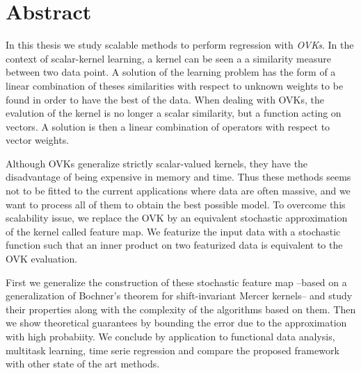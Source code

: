 


\begingroup
\let\clearpage\relax
\let\cleardoublepage\relax
\let\cleardoublepage\relax

\chapter*{Abstract}
In this thesis we study scalable methods to perform regression with \emph{\acl{OVK}s}. In the context of scalar-kernel learning, a kernel can be seen a a similarity measure between two data point. A solution of the learning problem has the form of a linear combination of theses similarities with respect to unknown weights to be found in order to have the best  of the data. When dealing with \acl{OVK}s, the evalution of the kernel is no longer a scalar similarity, but a function acting on vectors. A solution is then a linear combination of operators with respect to vector weights.

Although \acl{OVK}s generalize strictly scalar-valued kernels, they have the disadvantage of being expensive in memory and time. Thus these methods seems not to be fitted to the current applications where data are often massive, and we want to process all of them to obtain the best possible model. To overcome this scalability issue, we replace the \acl{OVK} by an equivalent stochastic approximation of the kernel called feature map. We featurize the input data with a stochastic function such that an inner product on two featurized data is equivalent to the \acl{OVK} evaluation.

First we generalize the construction of these stochastic feature map --based on a generalization of Bochner's theorem for shift-invariant Mercer kernels-- and study their properties along with the complexity of the algorithms based on them. Then we show theoretical guarantees by bounding the error due to the approximation with high probabiity. We conclude by application to functional data analysis, multitask learning, time serie regression and compare the proposed framework with other state of the art methods.

\endgroup

\vfill
